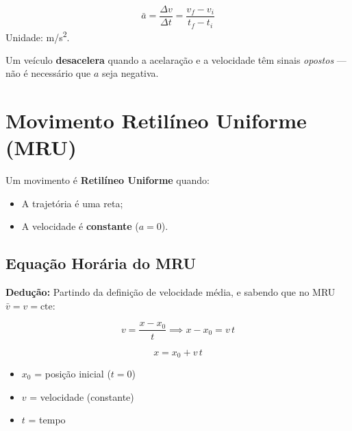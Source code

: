 \documentclass[12pt,a4paper]{article}
\begin{document}
\begin{tcolorbox}[formulabox={Acelera\c{c}\~ao M\'edia}]
  \[
    \bar{a} = \frac{\Delta v}{\Delta t} = \frac{v_f - v_i}{t_f - t_i}
  \]
  Unidade: m/s\textsuperscript{2}.
\end{tcolorbox}

\begin{tcolorbox}[atencaobox]
  Um veículo \textbf{desacelera} quando a acelaração e a velocidade têm sinais
  \emph{opostos} --- não é necessário que $a$ seja negativa.
\end{tcolorbox}


\section{Movimento Retil\'ineo Uniforme (MRU)}

\begin{tcolorbox}[defbox={Defini\c{c}\~ao: MRU}]
  Um movimento \'e \textbf{Retil\'ineo Uniforme} quando:
  \begin{itemize}[nosep]
    \item A trajet\'oria \'e uma reta;
    \item A velocidade \'e \textbf{constante} ($a = 0$).
  \end{itemize}
\end{tcolorbox}

\subsection{Equa\c{c}\~ao Hor\'aria do MRU}

\textbf{Dedu\c{c}\~ao:} Partindo da defini\c{c}\~ao de velocidade m\'edia, e
sabendo que no MRU $\bar{v} = v = \text{cte}$:

\[
  v = \frac{x - x_0}{t} \implies x - x_0 = v\,t
\]

\begin{tcolorbox}[formulabox={Equa\c{c}\~ao Hor\'aria do MRU}]
  \[
    \boxed{x = x_0 + v\,t}
  \]
  \begin{itemize}[nosep]
    \item $x_0$ = posi\c{c}\~ao inicial ($t = 0$)
    \item $v$ = velocidade (constante)
    \item $t$ = tempo
  \end{itemize}
\end{tcolorbox}
\end{document}
